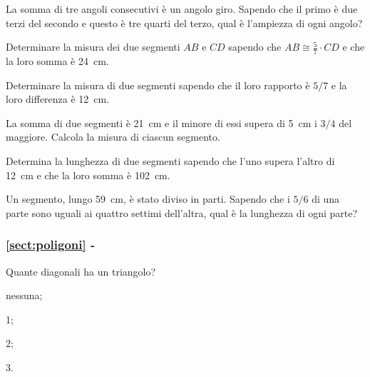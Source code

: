 \begin{multicols}{2}
\begin{esercizio}
\label{ese:1.119}
La somma di tre angoli consecutivi è un angolo giro. Sapendo che il primo è due terzi del secondo e questo è tre quarti del terzo, qual è l'ampiezza di ogni angolo?
\end{esercizio}

\begin{esercizio}
\label{ese:1.120}
Determinare la misura dei due segmenti $AB$ e $CD$ sapendo che $AB\cong \frac{5}{7}\cdot CD$ e che la loro somma è 24~cm.
\end{esercizio}

\begin{esercizio}
\label{ese:1.121}
Determinare la misura di due segmenti sapendo che il loro rapporto è $5/7$ e la loro differenza è 12~cm.
\end{esercizio}

\begin{esercizio}
\label{ese:1.122}
La somma di due segmenti è 21~cm e il minore di essi supera di 5~cm i $3/4$ del maggiore. Calcola la misura di ciascun segmento.
\end{esercizio}

\begin{esercizio}
\label{ese:1.123}
Determina la lunghezza di due segmenti sapendo che l'uno supera l'altro di 12~cm e che la loro somma è 102~cm.
\end{esercizio}

\begin{esercizio}
\label{ese:1.124}
Un segmento, lungo 59~cm, è stato diviso in parti. Sapendo che i $5/6$ di una parte sono uguali ai quattro settimi dell'altra, qual è la lunghezza di ogni parte?
\end{esercizio}

\end{multicols}

\begingroup
\hypersetup{linkcolor=black}
\subsubsection*{\ref{sect:poligoni} - }
\endgroup

\begin{esercizio}
\label{ese:1.125}
Quante diagonali ha un triangolo?
\begin{multicols}{4}
\begin{enumeratea}
\item nessuna;
\item 1;
\item 2;
\item 3.
\end{enumeratea}
\end{multicols}
\end{esercizio}

